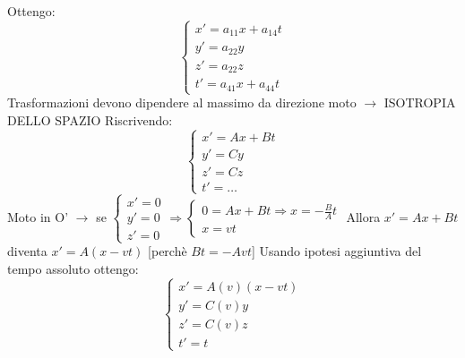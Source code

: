 \documentclass[a4paper,11pt]{report}
\theoremstyle{remark}
\theoremstyle{definition}
\begin{document}
Ottengo:
\begin{equation*}
    \begin{cases}
        x' = a_{11}x + a_{14}t \\
        y' = a_{22}y \\
        z' = a_{22}z \\
        t' = a_{41}x + a_{44}t
    \end{cases}
\end{equation*}
Trasformazioni devono dipendere al massimo da direzione moto $\rightarrow$ ISOTROPIA DELLO SPAZIO \newline
Riscrivendo:
\begin{equation*}
    \begin{cases}
        x' = Ax + Bt \\
        y' = Cy \\
        z' = Cz \\
        t' = \dots 
    \end{cases}
\end{equation*}
Moto in O' $\rightarrow$ se 
$\begin{cases}
    x'=0 \\
    y'=0 \\
    z'=0
\end{cases} 
\Rightarrow 
\begin{cases}
    0 = Ax + Bt  \Rightarrow x = - \frac{B}{A}t\\
    x = vt 
\end{cases}$ 
\newline Allora $x' = Ax +Bt$ diventa $x'=A(x-vt)$ [perchè $Bt = -Avt$] \newline
Usando ipotesi aggiuntiva del tempo assoluto ottengo:
\begin{equation*}
    \begin{cases}
        x' = A(v)(x -vt) \\
        y' = C(v)y \\
        z' = C(v)z \\
        t' = t 
    \end{cases}
\end{equation*}
\end{document}
